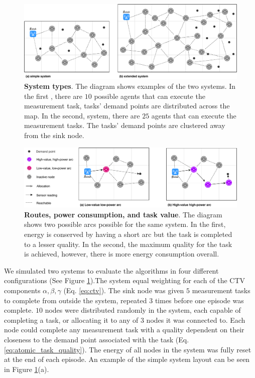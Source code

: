 \begin{figure}[ht]
	\centering
	\includegraphics[width=0.9\linewidth]{system-types}
	\caption{\textbf{System types}. The diagram shows examples of the two systems. In the first \simulationSimple{}{}, there are $10$ possible agents that can execute the measurement task, tasks' demand points are distributed across the map. In the second, \simulationExtended{}{} system, there are $25$ agents that can execute the measurement tasks. The tasks' demand points are clustered away from the sink node.}
	\label{fig:system-types}
\end{figure}
\begin{figure}[ht]
	\centering
	\includegraphics[width=0.9\linewidth]{route-types}
	\caption{\textbf{Routes, power consumption, and task value}. The diagram shows two possible arcs possible for the same system. In the first, energy is conserved by having a short arc but the task is completed to a lesser quality. In the second, the maximum quality for the task is achieved, however, there is more energy consumption overall.}
	\label{fig:route_types}
\end{figure}
We simulated two systems to evaluate the algorithms in four different configurations (See Figure \ref{fig:system-types}).The \simulationSimple{}{} system  equal weighting for each of the CTV components $\alpha, \beta, \gamma$ (Eq. \ref{eq:ctv}). The sink node was given $5$ measurement tasks to complete from outside the system, repeated $3$ times before one episode was complete. $10$ nodes were distributed randomly in the system, each capable of completing a task, or allocating it to any of $3$ nodes it was connected to. Each node could complete any measurement task with a quality dependent on their closeness to the demand point associated with the task (Eq. \ref{eq:atomic_task_quality}). The energy of all nodes in the system was fully reset at the end of each episode. An example of the simple system layout can be seen in Figure \ref{fig:system-types}(a). 

